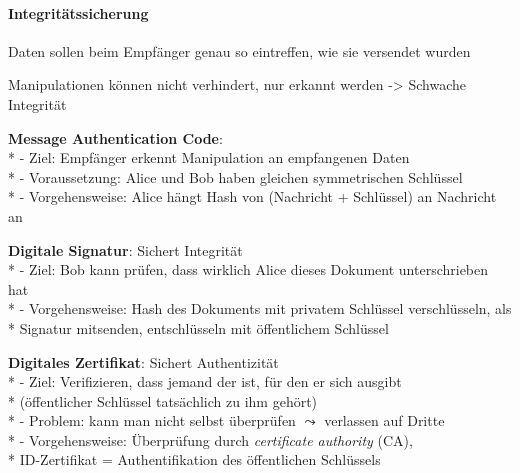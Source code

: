 \paragraph{Integritätssicherung}
\begin{items}
	\item Daten sollen beim Empfänger genau so eintreffen, wie sie versendet wurden
	\item Manipulationen können nicht verhindert, nur erkannt werden -> Schwache Integrität
	\smallskip

	\item \textbf{Message Authentication Code}: \\*
		- Ziel: Empfänger erkennt Manipulation an empfangenen Daten \\*
		- Voraussetzung: Alice und Bob haben gleichen symmetrischen Schlüssel \\*
		- Vorgehensweise: Alice hängt Hash von (Nachricht + Schlüssel) an Nachricht an
		
		\smallskip
	\item \textbf{Digitale Signatur}: Sichert Integrität\\*
	- Ziel: Bob kann prüfen, dass wirklich Alice dieses Dokument unterschrieben hat \\*
	- Vorgehensweise: Hash des Dokuments mit privatem Schlüssel verschlüsseln, als \\* \phantom{-} Signatur mitsenden, entschlüsseln mit öffentlichem Schlüssel
	
	\smallskip
	\item \textbf{Digitales Zertifikat}: Sichert Authentizität\\*
	- Ziel: Verifizieren, dass jemand der ist, für den er sich ausgibt\\*
	 	(öffentlicher Schlüssel tatsächlich zu ihm gehört) \\*
	- Problem: kann man nicht selbst überprüfen \( \leadsto \) verlassen auf Dritte \\*
	- Vorgehensweise: Überprüfung durch \emph{certificate authority} (CA), \\* \phantom{-} ID-Zertifikat = Authentifikation des öffentlichen Schlüssels
\end{items}

